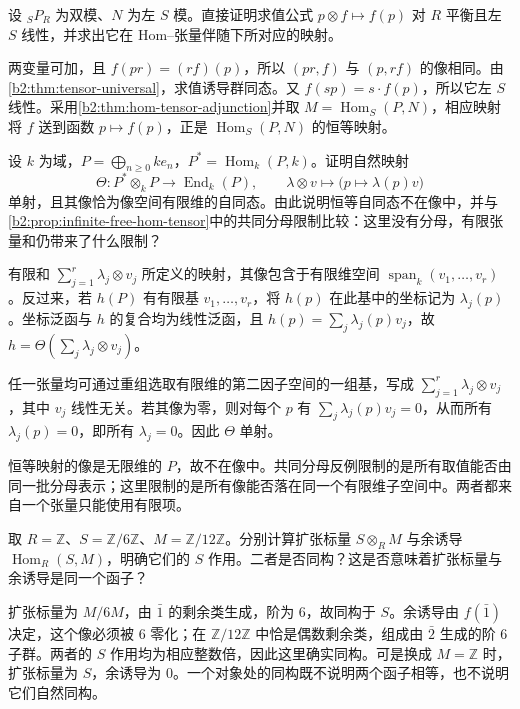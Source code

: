 \begin{exercise}\label{b2:ex:06-adjunction-evaluation}
	设 \({}_SP_R\) 为双模、\(N\) 为左 \(S\) 模。直接证明求值公式 \(p\otimes f\mapsto f(p)\) 对 \(R\) 平衡且左 \(S\) 线性，并求出它在 Hom–张量伴随下所对应的映射。
\end{exercise}
\begin{solution}
	两变量可加，且 \(f(pr)=(rf)(p)\)，所以 \((pr,f)\) 与 \((p,rf)\) 的像相同。由\cref{b2:thm:tensor-universal}，求值诱导群同态。又 \(f(sp)=s\cdot f(p)\)，所以它左 \(S\) 线性。采用\cref{b2:thm:hom-tensor-adjunction}并取 \(M=\operatorname{Hom}_S(P,N)\)，相应映射将 \(f\) 送到函数 \(p\mapsto f(p)\)，正是 \(\operatorname{Hom}_S(P,N)\) 的恒等映射。
\end{solution}

\begin{exercise}\label{b2:ex:06-hom-tensor-finite-free}
	设 \(k\) 为域，\(P=\bigoplus_{n\ge0}k e_n\)，\(P^*=\operatorname{Hom}_k(P,k)\)。证明自然映射
	\[
		\Theta:P^*\otimes_kP\longrightarrow\operatorname{End}_k(P), \qquad \lambda\otimes v\longmapsto\bigl(p\mapsto\lambda(p)v\bigr)
	\]
	单射，且其像恰为像空间有限维的自同态。由此说明恒等自同态不在像中，并与\cref{b2:prop:infinite-free-hom-tensor}中的共同分母限制比较：这里没有分母，有限张量和仍带来了什么限制？
\end{exercise}
\begin{solution}
	有限和 \(\sum_{j=1}^r\lambda_j\otimes v_j\) 所定义的映射，其像包含于有限维空间 \(\operatorname{span}_k(v_1,\ldots,v_r)\)。反过来，若 \(h(P)\) 有有限基 \(v_1,\ldots,v_r\)，将 \(h(p)\) 在此基中的坐标记为 \(\lambda_j(p)\)。坐标泛函与 \(h\) 的复合均为线性泛函，且 \(h(p)=\sum_j\lambda_j(p)v_j\)，故 \(h=\Theta(\sum_j\lambda_j\otimes v_j)\)。

	任一张量均可通过重组选取有限维的第二因子空间的一组基，写成 \(\sum_{j=1}^r\lambda_j\otimes v_j\)，其中 \(v_j\) 线性无关。若其像为零，则对每个 \(p\) 有 \(\sum_j\lambda_j(p)v_j=0\)，从而所有 \(\lambda_j(p)=0\)，即所有 \(\lambda_j=0\)。因此 \(\Theta\) 单射。

	恒等映射的像是无限维的 \(P\)，故不在像中。共同分母反例限制的是所有取值能否由同一批分母表示；这里限制的是所有像能否落在同一个有限维子空间中。两者都来自一个张量只能使用有限项。
\end{solution}

\begin{exercise}\label{b2:ex:06-coinduction-quotient}
	取 \(R=\mathbb Z\)、\(S=\mathbb Z/6\mathbb Z\)、\(M=\mathbb Z/12\mathbb Z\)。分别计算扩张标量 \(S\otimes_RM\) 与余诱导 \(\operatorname{Hom}_R(S,M)\)，明确它们的 \(S\) 作用。二者是否同构？这是否意味着扩张标量与余诱导是同一个函子？
\end{exercise}
\begin{solution}
	扩张标量为 \(M/6M\)，由 \(\bar1\) 的剩余类生成，阶为 \(6\)，故同构于 \(S\)。余诱导由 \(f(\bar1)\) 决定，这个像必须被 \(6\) 零化；在 \(\mathbb Z/12\mathbb Z\) 中恰是偶数剩余类，组成由 \(\bar2\) 生成的阶 \(6\) 子群。两者的 \(S\) 作用均为相应整数倍，因此这里确实同构。可是换成 \(M=\mathbb Z\) 时，扩张标量为 \(S\)，余诱导为 \(0\)。一个对象处的同构既不说明两个函子相等，也不说明它们自然同构。
\end{solution}

